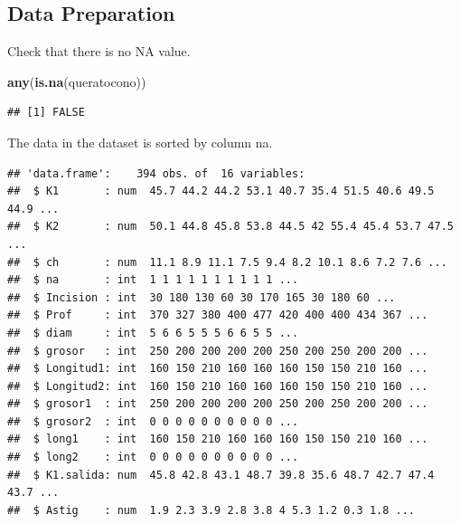 \documentclass[
]{article}
\newenvironment{Shaded}{\begin{snugshade}}{\end{snugshade}}
\newcommand{\KeywordTok}[1]{\textcolor[rgb]{0.13,0.29,0.53}{\textbf{#1}}}
\newcommand{\NormalTok}[1]{#1}
\newcommand{\OperatorTok}[1]{\textcolor[rgb]{0.81,0.36,0.00}{\textbf{#1}}}
\newcommand{\StringTok}[1]{\textcolor[rgb]{0.31,0.60,0.02}{#1}}
\begin{document}
\hypertarget{data-preparation}{%
\subsection{Data Preparation}\label{data-preparation}}

Check that there is no NA value.

\begin{Shaded}
\begin{Highlighting}[]
\KeywordTok{any}\NormalTok{(}\KeywordTok{is.na}\NormalTok{(queratocono))}
\end{Highlighting}
\end{Shaded}

\begin{verbatim}
## [1] FALSE
\end{verbatim}

The data in the dataset is sorted by column na.

\begin{Shaded}
\end{Shaded}

\begin{verbatim}
## 'data.frame':    394 obs. of  16 variables:
##  $ K1       : num  45.7 44.2 44.2 53.1 40.7 35.4 51.5 40.6 49.5 44.9 ...
##  $ K2       : num  50.1 44.8 45.8 53.8 44.5 42 55.4 45.4 53.7 47.5 ...
##  $ ch       : num  11.1 8.9 11.1 7.5 9.4 8.2 10.1 8.6 7.2 7.6 ...
##  $ na       : int  1 1 1 1 1 1 1 1 1 1 ...
##  $ Incision : int  30 180 130 60 30 170 165 30 180 60 ...
##  $ Prof     : int  370 327 380 400 477 420 400 400 434 367 ...
##  $ diam     : int  5 6 6 5 5 5 6 6 5 5 ...
##  $ grosor   : int  250 200 200 200 200 250 200 250 200 200 ...
##  $ Longitud1: int  160 150 210 160 160 160 150 150 210 160 ...
##  $ Longitud2: int  160 150 210 160 160 160 150 150 210 160 ...
##  $ grosor1  : int  250 200 200 200 200 250 200 250 200 200 ...
##  $ grosor2  : int  0 0 0 0 0 0 0 0 0 0 ...
##  $ long1    : int  160 150 210 160 160 160 150 150 210 160 ...
##  $ long2    : int  0 0 0 0 0 0 0 0 0 0 ...
##  $ K1.salida: num  45.8 42.8 43.1 48.7 39.8 35.6 48.7 42.7 47.4 43.7 ...
##  $ Astig    : num  1.9 2.3 3.9 2.8 3.8 4 5.3 1.2 0.3 1.8 ...
\end{verbatim}
\end{document}
